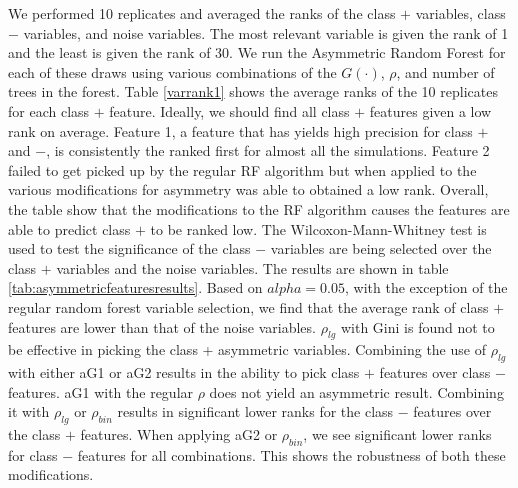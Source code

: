 \documentclass[twoside,11pt]{article}
\begin{document}
We performed 10 replicates and averaged the ranks of the class $+$ variables, class $-$ variables, and noise variables. The most relevant variable is given the rank of 1 and the least is given the rank of 30. We run the Asymmetric Random Forest for each of these draws using various combinations of the $G(\cdot)$, $\rho$, and number of trees in the forest. Table \ref{varrank1} shows the average ranks of the 10 replicates for each class $+$ feature. Ideally, we should find all class $+$ features given a low rank on average. Feature 1, a feature that has yields high precision for class $+$ and $-$, is consistently the ranked first for almost all the simulations. Feature 2 failed to get picked up by the regular RF algorithm but when applied to the various modifications for asymmetry was able to obtained a low rank. Overall, the table show that the modifications to the RF algorithm causes the features are able to predict class $+$ to be ranked low. The Wilcoxon-Mann-Whitney test is used to test the significance of the class $-$ variables are being selected over the class $+$ variables and the noise variables. The results are shown in table \ref{tab:asymmetricfeaturesresults}. Based on $alpha=0.05$, with the exception of the regular random forest variable selection, we find that the average rank of class $+$ features are lower than that of the noise variables. $\rho_{lg}$ with Gini is found not to be effective in picking the class + asymmetric variables. Combining the use of $\rho_{lg}$ with either aG1 or aG2 results in the ability to pick class $+$ features over class $-$ features. aG1 with the regular $\rho$ does not yield an asymmetric result. Combining it with $\rho_{lg}$ or $\rho_{bin}$ results in significant lower ranks for the class $-$ features over the class $+$ features. When applying aG2 or $\rho_{bin}$, we see significant lower ranks for class $-$ features for all combinations. This shows the robustness of both these modifications. 
\end{document}
